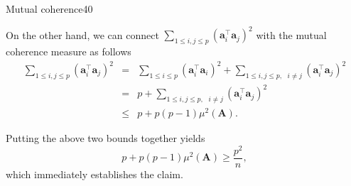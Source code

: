 \documentclass{article}
\begin{document}
\begin{problem}{Mutual coherence}{40}
{On the other hand, we can connect $\sum_{1\leq i,j\leq p}\left(\bm{a}_{i}^{\top}\bm{a}_{j}\right)^{2}$ with the mutual coherence measure as follows
\begin{eqnarray*}
\sum_{1\leq i,j\leq p}\left(\bm{a}_{i}^{\top}\bm{a}_{j}\right)^{2} & = & \sum_{1\leq i\leq p}\left(\bm{a}_{i}^{\top}\bm{a}_{i}\right)^{2}+\sum_{1\leq i,j\leq p,\text{ }i\neq j}\left(\bm{a}_{i}^{\top}\bm{a}_{j}\right)^{2}\\
 & = & p+\sum_{1\leq i,j\leq p,\text{ }i\neq j}\left(\bm{a}_{i}^{\top}\bm{a}_{j}\right)^{2}\\
 & \leq & p + p(p-1) \mu^2(\bm{A}).
\end{eqnarray*}

Putting the above two bounds together yields 
\[
  p + p(p-1) \mu^2(\bm{A}) \geq \frac{p^{2}}{n},
\]
which immediately establishes the claim.
}


\end{problem}
\end{document}
